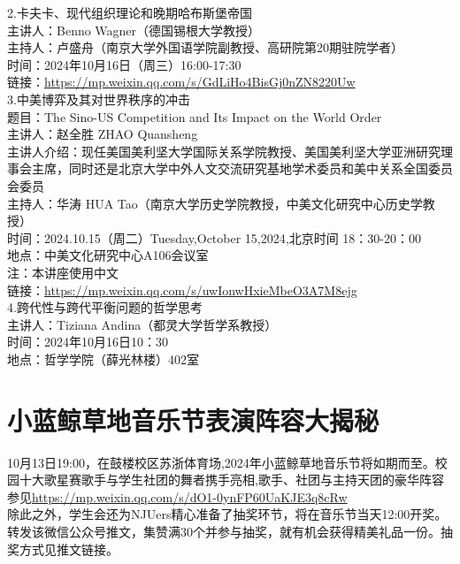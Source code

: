 \documentclass[letterpaper, 12pt]{article}
\begin{document}
\begin{multicols}{2}
2.卡夫卡、现代组织理论和晚期哈布斯堡帝国\\
主讲人：Benno Wagner（德国锡根大学教授）\\
主持人：卢盛舟（南京大学外国语学院副教授、高研院第20期驻院学者）\\
时间：2024年10月16日（周三）16:00-17:30\\
链接：\url{https://mp.weixin.qq.com/s/GdLiHo4BisGj0nZN8220Uw}\\

3.中美博弈及其对世界秩序的冲击\\
题目：The Sino-US Competition and Its Impact on the World Order\\
主讲人：赵全胜 ZHAO Quansheng\\
主讲人介绍：现任美国美利坚大学国际关系学院教授、美国美利坚大学亚洲研究理事会主席，同时还是北京大学中外人文交流研究基地学术委员和美中关系全国委员会委员\\
主持人：华涛 HUA Tao（南京大学历史学院教授，中美文化研究中心历史学教授）\\
时间：2024.10.15（周二）Tuesday,October 15,2024,北京时间 18：30-20：00\\
地点：中美文化研究中心A106会议室\\
注：本讲座使用中文\\
链接：\url{https://mp.weixin.qq.com/s/uwIonwHxieMbeO3A7M8ejg}\\

4.跨代性与跨代平衡问题的哲学思考\\
主讲人：Tiziana Andina（都灵大学哲学系教授）\\
时间：2024年10月16日10：30\\
地点：哲学学院（薛光林楼）402室\\

\section{小蓝鲸草地音乐节表演阵容大揭秘}
10月13日19:00，在鼓楼校区苏浙体育场,2024年小蓝鲸草地音乐节将如期而至。校园十大歌星赛歌手与学生社团的舞者携手亮相,歌手、社团与主持天团的豪华阵容参见\url{https://mp.weixin.qq.com/s/dO1-0ynFP60UaKJE3q8cRw}\\
除此之外，学生会还为NJUers精心准备了抽奖环节，将在音乐节当天12:00开奖。转发该微信公众号推文，集赞满30个并参与抽奖，就有机会获得精美礼品一份。抽奖方式见推文链接。

\end{multicols}
\end{document}
